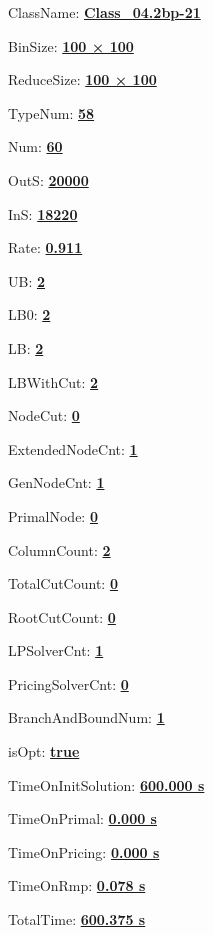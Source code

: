 \documentclass[11pt]{article}
\begin{document}
\pagestyle{empty}


ClassName: \underline{\textbf{Class_04.2bp-21}}
\par
BinSize: \underline{\textbf{100 × 100}}
\par
ReduceSize: \underline{\textbf{100 × 100}}
\par
TypeNum: \underline{\textbf{58}}
\par
Num: \underline{\textbf{60}}
\par
OutS: \underline{\textbf{20000}}
\par
InS: \underline{\textbf{18220}}
\par
Rate: \underline{\textbf{0.911}}
\par
UB: \underline{\textbf{2}}
\par
LB0: \underline{\textbf{2}}
\par
LB: \underline{\textbf{2}}
\par
LBWithCut: \underline{\textbf{2}}
\par
NodeCut: \underline{\textbf{0}}
\par
ExtendedNodeCnt: \underline{\textbf{1}}
\par
GenNodeCnt: \underline{\textbf{1}}
\par
PrimalNode: \underline{\textbf{0}}
\par
ColumnCount: \underline{\textbf{2}}
\par
TotalCutCount: \underline{\textbf{0}}
\par
RootCutCount: \underline{\textbf{0}}
\par
LPSolverCnt: \underline{\textbf{1}}
\par
PricingSolverCnt: \underline{\textbf{0}}
\par
BranchAndBoundNum: \underline{\textbf{1}}
\par
isOpt: \underline{\textbf{true}}
\par
TimeOnInitSolution: \underline{\textbf{600.000 s}}
\par
TimeOnPrimal: \underline{\textbf{0.000 s}}
\par
TimeOnPricing: \underline{\textbf{0.000 s}}
\par
TimeOnRmp: \underline{\textbf{0.078 s}}
\par
TotalTime: \underline{\textbf{600.375 s}}
\par
\newpage
\end{document}
